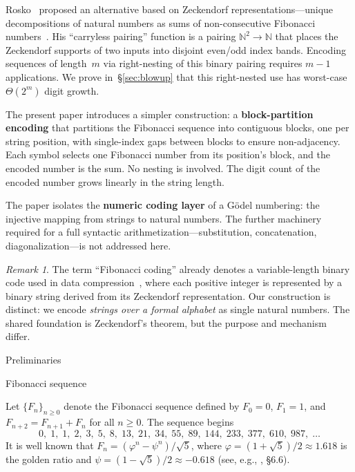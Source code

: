 \documentclass[11pt]{amsart}
\makeatletter
\renewcommand{\section}{\@startsection{section}{1}%
  \z@{.7\linespacing\@plus\linespacing}{.5\linespacing}%
  {\normalfont\bfseries}}
\renewcommand{\subsection}{\@startsection{subsection}{2}%
  \z@{.5\linespacing\@plus.7\linespacing}{-.5em}%
  {\normalfont\bfseries}}
\theoremstyle{plain}
\theoremstyle{definition}
\theoremstyle{remark}
\newtheorem{remark}[theorem]{Remark}
\makeatother
\begin{document}
Rosko~\cite{Rosko2025} proposed an alternative based on Zeckendorf representations---unique decompositions of natural numbers as sums of non-consecutive Fibonacci numbers~\cite{Zeckendorf1972,Lekkerkerker1952}. His ``carryless pairing'' function is a pairing $\mathbb{N}^2 \to \mathbb{N}$ that places the Zeckendorf supports of two inputs into disjoint even/odd index bands. Encoding sequences of length~$m$ via right-nesting of this binary pairing requires $m-1$ applications. We prove in~\S\ref{sec:blowup} that this right-nested use has worst-case $\Theta(2^m)$ digit growth.

The present paper introduces a simpler construction: a \textbf{block-partition encoding} that partitions the Fibonacci sequence into contiguous blocks, one per string position, with single-index gaps between blocks to ensure non-adjacency. Each symbol selects one Fibonacci number from its position's block, and the encoded number is the sum. No nesting is involved. The digit count of the encoded number grows linearly in the string length.

The paper isolates the \textbf{numeric coding layer} of a G\"odel numbering: the injective mapping from strings to natural numbers. The further machinery required for a full syntactic arithmetization---substitution, concatenation, diagonalization---is not addressed here.

\begin{remark}\label{rem:fibonacci-coding}
The term ``Fibonacci coding'' already denotes a variable-length binary code used in data compression~\cite{Fraenkel1985}, where each positive integer is represented by a binary string derived from its Zeckendorf representation. Our construction is distinct: we encode \emph{strings over a formal alphabet} as single natural numbers. The shared foundation is Zeckendorf's theorem, but the purpose and mechanism differ.
\end{remark}


\section{Preliminaries}

\subsection{Fibonacci sequence}

Let $\{F_n\}_{n \ge 0}$ denote the Fibonacci sequence defined by $F_0=0$, $F_1=1$, and $F_{n+2}=F_{n+1}+F_n$ for all $n \ge 0$. The sequence begins
\[
0,\; 1,\; 1,\; 2,\; 3,\; 5,\; 8,\; 13,\; 21,\; 34,\; 55,\; 89,\; 144,\; 233,\; 377,\; 610,\; 987,\; \ldots
\]
It is well known that $F_n = (\varphi^n - \psi^n)/\sqrt{5}$, where $\varphi = (1+\sqrt{5})/2 \approx 1.618$ is the golden ratio and $\psi = (1-\sqrt{5})/2 \approx -0.618$ (see, e.g., \cite{GKP1994}, \S6.6).
\end{document}
